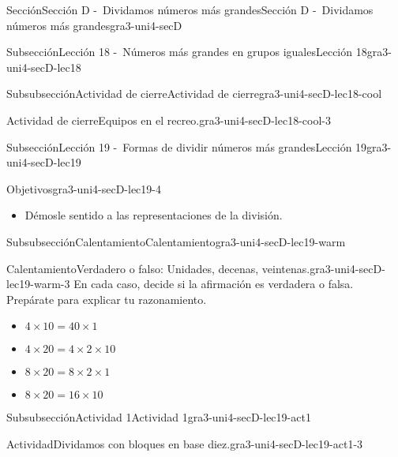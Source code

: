 \documentclass[twoside,14pt,]{extarticle}
\begin{document}
\begin{sectionptx}{Sección}{Sección D -~Dividamos números más grandes}{}{Sección D -~Dividamos números más grandes}{}{}{gra3-uni4-secD}
\begin{subsectionptx}{Subsección}{Lección 18 -~Números más grandes en grupos iguales}{}{Lección 18}{}{}{gra3-uni4-secD-lec18}
\begin{subsubsectionptx}{Subsubsección}{Actividad de cierre}{}{Actividad de cierre}{}{}{gra3-uni4-secD-lec18-cool}
\begin{project}{Actividad de cierre}{Equipos en el recreo.}{gra3-uni4-secD-lec18-cool-3}
\end{project}%
\end{subsubsectionptx}
\end{subsectionptx}
%
%
\typeout{************************************************}
\typeout{************************************************}
%
\begin{subsectionptx}{Subsección}{Lección 19 -~Formas de dividir números más grandes}{}{Lección 19}{}{}{gra3-uni4-secD-lec19}
\begin{objectives}{Objetivos}{gra3-uni4-secD-lec19-4}
%
\begin{itemize}[label=\textbullet]
\item{}Démosle sentido a las representaciones de la división.%
\end{itemize}
\end{objectives}
%
%
\typeout{************************************************}
\typeout{************************************************}
%
\begin{subsubsectionptx}{Subsubsección}{Calentamiento}{}{Calentamiento}{}{}{gra3-uni4-secD-lec19-warm}
\begin{exploration}{Calentamiento}{Verdadero o falso: Unidades, decenas, veintenas.}{gra3-uni4-secD-lec19-warm-3}%
En cada caso, decide si la afirmación es verdadera o falsa. Prepárate para explicar tu razonamiento.%
%
\begin{itemize}[label=\textbullet]
\item{}\(\displaystyle 4 \times 10 = 40 \times 1\)%
\item{}\(\displaystyle 4 \times 20 = 4 \times 2 \times 10\)%
\item{}\(\displaystyle 8 \times 20 = 8 \times 2 \times 1\)%
\item{}\(\displaystyle 8 \times 20 = 16 \times 10\)%
\end{itemize}
\end{exploration}%
\end{subsubsectionptx}
%
%
\typeout{************************************************}
\typeout{************************************************}
%
\begin{subsubsectionptx}{Subsubsección}{Actividad 1}{}{Actividad 1}{}{}{gra3-uni4-secD-lec19-act1}
\begin{activity}{Actividad}{Dividamos con bloques en base diez.}{gra3-uni4-secD-lec19-act1-3}%
\begin{sidebyside}{2}{0}{0.1}{0}%

\end{sidebyside}
\end{activity}
\end{subsubsectionptx}
\end{subsectionptx}
\end{sectionptx}
\end{document}
